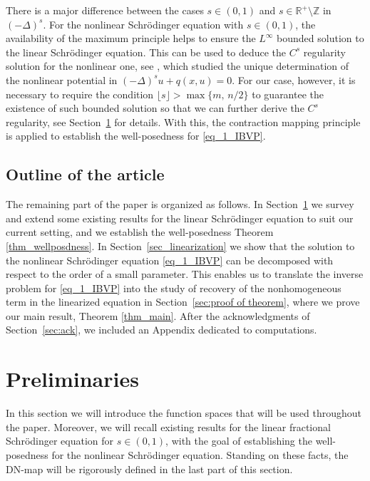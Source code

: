\documentclass [oneside,11pt] {amsart}
\newcommand{\floor}[1]{\lfloor #1 \rfloor}
\numberwithin{equation}{section}
\newcommand{\R}{\mathbb{R}}
\begin{document}
There is a major difference between the cases $s\in (0,1)$ and $s\in \R^+\setminus\mathbb{Z}$ in $(-\Delta)^s$. For the nonlinear Schr\"odinger equation with $s\in (0,1)$, the availability of the maximum principle helps to ensure the $L^\infty$ bounded solution to the linear Schr\"odinger equation. This can be used to deduce the $C^s$ regularity solution for the nonlinear one, see \cite{lai_global_2018}, which studied the unique determination of the nonlinear potential in $(-\Delta)^s u +q(x,u)=0$. For our case, however, it is necessary to require the condition $\floor{s}>\max\{m,\,n/2\}$ to guarantee the existence of such bounded solution so that we can further derive the $C^s$ regularity, see Section~\ref{sec:pre} for details. With this, the contraction mapping principle is applied to establish the well-posedness for \eqref{eq_1_IBVP}.

\subsection{Outline of the article}

The remaining part of the paper is organized as follows. In Section~\ref{sec:pre} we survey and extend some existing results for the linear Schr\"odinger equation to suit our current setting, and we establish the well-posedness Theorem \ref{thm_wellposdness}. In Section~\ref{sec_linearization} we show that the solution to the nonlinear Schr\"odinger equation \eqref{eq_1_IBVP} can be decomposed with respect to the order of a small parameter. This enables us to translate the  inverse problem for \eqref{eq_1_IBVP} into the study of recovery of the nonhomogeneous term in the linearized equation in Section~\ref{sec:proof of theorem}, where we prove our main result, Theorem \ref{thm_main}. After the acknowledgments of Section~\ref{sec:ack}, we included an Appendix dedicated to computations.


\section{Preliminaries}\label{sec:pre}
In this section we will introduce the function spaces that will be used throughout the paper. Moreover, we will recall existing results for the linear fractional Schr\"odinger equation for $s\in(0,1)$, with the goal of establishing the well-posedness for the nonlinear Schr\"odinger equation. Standing on these facts, the DN-map will be rigorously defined in the last part of this section. 
\end{document}
